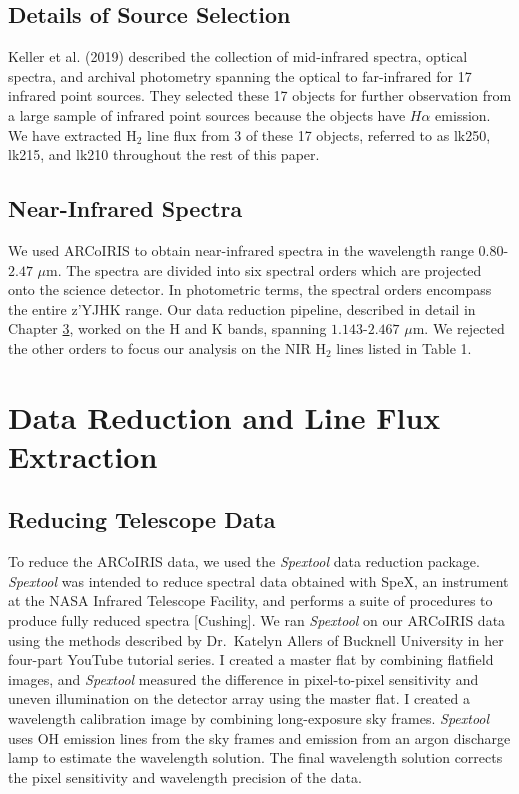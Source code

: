\documentclass[12pt, letterpaper]{book}
\begin{document}
\section{Details of Source Selection}
 Keller et al. (2019) described the collection of mid-infrared spectra, optical spectra, and archival photometry spanning the optical to far-infrared for 17 infrared point sources. They selected these 17 objects for further observation from a large sample of infrared point sources because the objects have $H\alpha$ emission. We have extracted $\textrm{H}_2$ line flux from 3 of these 17 objects, referred to as lk250, lk215, and lk210 throughout the rest of this paper.

\section{Near-Infrared Spectra}
We used ARCoIRIS to obtain near-infrared spectra in the wavelength range $0.80$-$2.47$ $\mu$m. The spectra are divided into six spectral orders which are projected onto the science detector. In photometric terms, the spectral orders encompass the entire z'YJHK range. Our data reduction pipeline, described in detail in Chapter \ref{chapter:data_reduction}, worked on the H and K bands, spanning $1.143$-$2.467$ $\mu$m. We rejected the other orders to focus our analysis on the NIR $\textrm{H}_2$ lines listed in Table 1.

\chapter{Data Reduction and Line Flux Extraction}
\label{chapter:data_reduction}

\section{Reducing Telescope Data}
To reduce the ARCoIRIS data, we used the {\em Spextool} data reduction package. {\em Spextool} was intended to reduce spectral data obtained with SpeX, an instrument at the NASA Infrared Telescope Facility, and performs a suite of procedures to produce fully reduced spectra [Cushing]. We ran {\em Spextool} on our ARCoIRIS data using the methods described by Dr.\ Katelyn Allers of Bucknell University in her four-part YouTube tutorial series. I created a master flat by combining flatfield images, and {\em Spextool} measured the difference in pixel-to-pixel sensitivity and uneven illumination on the detector array using the master flat. I created a wavelength calibration image by combining long-exposure sky frames. {\em Spextool} uses OH emission lines from the sky frames and emission from an argon discharge lamp to estimate the wavelength solution. The final wavelength solution corrects the pixel sensitivity and wavelength precision of the data.
\end{document}

